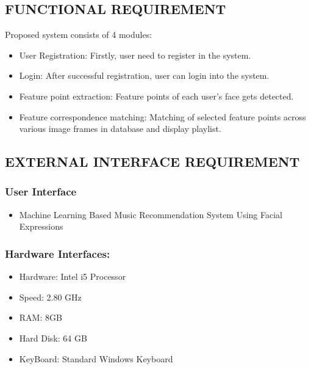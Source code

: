 \documentclass[12pt]{report}
\begin{document}
\centering
\raggedright
\subsection{ FUNCTIONAL REQUIREMENT}

\justifying
\setlength{\parindent}{4em}
\setlength{\parskip}{0.5em}
\renewcommand{\baselinestretch}{1.5}

\normalsize Proposed system consists of 4 modules:
\begin{itemize}\item User Registration: Firstly, user need to register in the system.
\item Login: After successful registration, user can login into the system.
\item Feature point extraction: Feature points of each user’s face gets detected.
\item Feature correspondence matching: Matching of selected feature points across
various image frames in database and display playlist.

\end{itemize}

\centering
\raggedright
\subsection{ EXTERNAL INTERFACE REQUIREMENT}

\justifying
\setlength{\parindent}{4em}
\setlength{\parskip}{0.5em}
\renewcommand{\baselinestretch}{1.5}
\subsubsection{ User Interface}
\normalsize\begin{itemize}\item  Machine Learning Based Music Recommendation System Using Facial 
Expressions
\end{itemize}
\subsubsection{ Hardware Interfaces:}
\normalsize\begin{itemize}\item   Hardware: Intel i5 Processor
\item  Speed: 2.80 GHz
\item  RAM: 8GB
\item  Hard Disk: 64 GB
\item  KeyBoard: Standard Windows Keyboard
\end{itemize}
\end{document}
